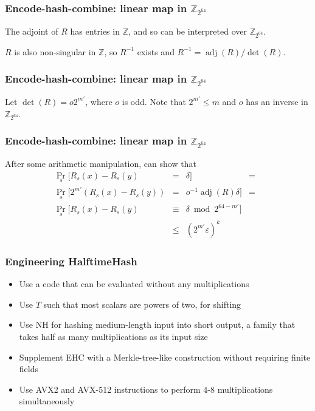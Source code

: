 \documentclass[xcolor=dvipsnames,hyperref={hidelinks}]{beamer}
\DeclareMathOperator{\adj}{adj}
\begin{document}
\begin{frame}
  \frametitle{Encode-hash-combine: linear map \textbf{ in $\mathbb{Z}_{2^{64}}$}}

  The adjoint of $R$ has entries in $\mathbb{Z}$, and so can be interpreted over $\mathbb{Z}_{2^{64}}$.
  \pause

  $ $\\
  $R$ is also non-singular in $\mathbb{Z}$, so $R^{-1}$ exists and $R^{-1} = \adj(R) / \det(R)$.
\end{frame}

\begin{frame}
  \frametitle{Encode-hash-combine: linear map \textbf{in $\mathbb{Z}_{2^{64}}$}}

  $ $\\
  Let $\det(R) = o 2^{m'}$, where $o$ is odd. Note that $2^{m'} \le m$ and $o$ has an inverse in $\mathbb{Z}_{2^{64}}$.
  
\end{frame}

\begin{frame}
  \frametitle{Encode-hash-combine: linear map \textbf{in $\mathbb{Z}_{2^{64}}$}}

  After some arithmetic manipulation, can show that
  \[
  \begin{array}{lcrcl}
    \Pr_s[R_s(x) - R_s(y) &= &\delta] & = & \\
    \Pr_s[2^{m'}(R_s(x) - R_s(y)) & = & o^{-1} \adj(R) \delta] & = & \\  %
    \Pr_s[R_s(x) - R_s(y) &\equiv& \delta \bmod 2^{64 - m'}] & \\ %
    & \le & (2^{m'} \varepsilon)^{k} %
  \end{array}
  \]
\end{frame}

\begin{frame}

  \frametitle{Engineering HalftimeHash}
  \pause
  \begin{itemize}
  \item Use a code that can be evaluated without any multiplications
  \pause
  \item Use $T$ such that most scalars are powers of two, for shifting
  \pause
  \item Use NH for hashing medium-length input into short output, a family that takes half as many multiplications as its input size
  \pause
  \item Supplement EHC with a Merkle-tree-like construction without requiring finite fields
  \pause
  \item Use AVX2 and AVX-512 instructions to perform 4-8 multiplications simultaneously
  \end{itemize}
\end{frame}
\end{document}

